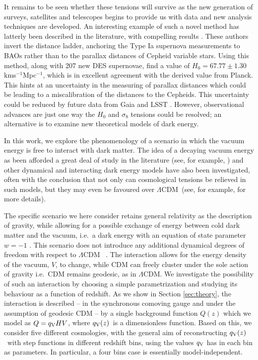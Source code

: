 \documentclass[a4paper,fleqn,usenatbib]{mnras}
\newcommand*{\qv}{$q_{\rm V}(z)$}
\newcommand*{\LCDM}{$\Lambda$CDM}
\newcommand*{\kmsMpc}{kms$^{-1}$Mpc$^{-1}$}
\begin{document}
It remains to be seen whether these tensions will survive as the new generation of surveys, satellites and telescopes begins to provide us with data and new analysis techniques are developed. An interesting example of such a novel method has latterly been described in the literature, with compelling results \citep{Aubourg2015, Macaulay:2018fxi}. These authors invert the distance ladder, anchoring the Type Ia supernova measurements to BAOs rather than to the parallax distances of Cepheid variable stars. Using this method, along with 207 new DES supernovae, \cite{Macaulay:2018fxi} find a value of $H_0 = 67.77 \pm 1.30$ \kmsMpc, which is in excellent agreement with the derived value from Planck.  This hints at an uncertainty in the measuring of parallax distances which could be leading to a miscalibration of the distances to the Cepheids. This uncertainty could be reduced by future data from Gaia \citep{Beaton:2018fyo} and LSST \citep{Ivesic2012}. However, observational advances are just one way the $H_0$ and $\sigma_8$ tensions could be resolved; an alternative is to examine new theoretical models of dark energy.

In this work, we explore the phenomenology of a scenario in which the vacuum energy is free to interact with dark matter. The idea of a decaying vacuum energy as been afforded a great deal of study in the literature (see, for example, \cite{Bertolami1986, Pavon1991, Alrawaf1996, Shapiro:2000dz, Sola:2011qr, Wands:2012vg}) and other dynamical and interacting dark energy models have also been investigated, often with the conclusion that not only can cosmological tensions be relieved in such models, but they may even be favoured over \LCDM \ (see, for example, \cite{Salvatelli2014, Wang:2015wga, Zhao:2017cud, Sola:2017lxc, DiValentino:2017iww, Kumar:2017dnp, Sola2018:lcd, Yang:2018qmz, Wang:2018fng} for more details).

The specific scenario we here consider retains general relativity as the description of gravity, while allowing for a possible exchange of energy between cold dark matter and the vacuum, i.e.\ a dark energy with an equation of state parameter $w=-1$ \citep{1931Natur.127..706L,Lemaitre1933}. This scenario does not introduce any additional dynamical degrees of freedom with respect to \LCDM~ \citep{Wands:2012vg}. The interaction allows for the energy density of the vacuum, $V$, to change, while CDM can freely cluster under the sole action of gravity i.e.\ CDM remains geodesic, as in $\Lambda$CDM. We investigate the possibility of such an interaction by choosing a simple parametrization and studying its behaviour as a function of redshift. As we show in Section \ref{sec:theory}, the interaction is described -- in the synchronous comoving gauge and under the assumption of geodesic CDM -- by a single background function $Q(z)$ which we model as $Q= q_{\rm V} H V$, where \qv\ is a dimensionless function. Based on this, we consider five different cosmologies, with the general aim of reconstructing \qv\  with step functions in different redshift bins, using the values $q_{\rm V}$ has in each bin as parameters.  In particular, a four bins case is  essentially model-independent.
\end{document}
